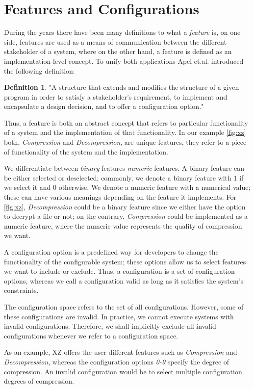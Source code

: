 \section{Features and Configurations}\label{feature-config}
\theoremstyle{definition}
\newtheorem{definition}{Definition}[section]

During the years there have been many definitions to what a \emph{feature} is, on one side, features are used as a means of communication between
the different stakeholder of a system, where on the other hand, a feature is defined as an implementation-level concept. 
To unify both applications Apel et.al. introduced the following definition:

\begin{definition}
    "A structure that extends and modifies the structure of a
    given program in order to satisfy a stakeholder's requirement, to implement and
    encapsulate a design decision, and to offer a configuration option."\cite{Feature-Oriented-Software-Product-Lines}     
\end{definition}

Thus, a feature is both an abstract concept that refers to particular functionality of a system and the implementation of that functionality.
In our example \autoref{fig:xz} both, \textit{Compression} and \textit{Decompression}, are unique features, they refer to a piece of functionality of the system and the
implementation. 

We differentiate between \emph{binary} features \emph{numeric} features. A binary feature can be either selected or deselected; 
commonly, we denote a binary feature with $1$ if we select it and $0$ otherwise. 
We denote a numeric feature with a numerical value; these can have various meanings depending on the feature it implements. 
For \autoref{fig:xz}, \textit{Decompression} could be a binary feature since we either have the option to decrypt a file or not; on the contrary, 
\textit{Compression} could be implemented as a numeric feature, where the numeric value represents the quality of compression we want. 

A configuration option is a predefined way for developers to change the functionality of the configurable system; 
these options allow us to select features we want to include or exclude. Thus, a configuration is a set of configuration options, whereas 
we call a configuration valid as long as it satisfies the system's constraints.

The configuration space refers to the set of all configurations. However, some of these configurations are invalid. 
In practice, we cannot execute systems with invalid configurations. 
Therefore, we shall implicitly exclude all invalid configurations whenever we refer to a configuration space.

As an example, \textsc{XZ} offers the user different features such as \textit{Compression} and \textit{Decompression}, whereas 
the configuration options \textit{0-9} specify the degree of compression. An invalid configuration would be to select multiple 
configuration degrees of compression.

